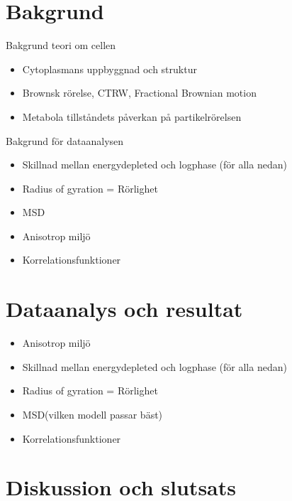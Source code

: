 \section{Bakgrund}

Bakgrund teori om cellen
\begin{itemize}
    \item Cytoplasmans uppbyggnad och struktur
    \item Brownsk rörelse, CTRW, Fractional Brownian motion
    \item Metabola tillståndets påverkan på partikelrörelsen
\end{itemize}
Bakgrund för dataanalysen
\begin{itemize}
    \item Skillnad mellan energydepleted och logphase (för alla nedan)
    \item Radius of gyration = Rörlighet
    \item MSD
    \item Anisotrop miljö
    \item Korrelationsfunktioner
\end{itemize}

\section{Dataanalys och resultat}

\begin{itemize}
    \item Anisotrop miljö
    \item Skillnad mellan energydepleted och logphase (för alla nedan)
    \item Radius of gyration = Rörlighet
    \item MSD(vilken modell passar bäst)
    \item Korrelationsfunktioner
\end{itemize}

\section{Diskussion och slutsats}